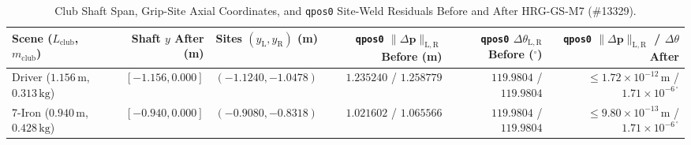 \documentclass[11pt,a4paper]{article}
\begin{document}
\begin{table}[h!]
\centering
\caption{Club Shaft Span, Grip-Site Axial Coordinates, and \texttt{qpos0} Site-Weld Residuals Before and After HRG-GS-M7 (\#13329).}
\label{tab:hrg-gs-m7-shaft-fix}
\small
\begin{tabular}{lrrrrr}
\toprule
Scene ($L_{\mathrm{club}}$, $m_{\mathrm{club}}$) & Shaft $y$ After (m) & Sites $(y_{\mathrm{L}}, y_{\mathrm{R}})$ (m) & \texttt{qpos0} $\|\Delta \mathbf{p}\|_{\mathrm{L,R}}$ Before (m) & \texttt{qpos0} $\Delta \theta_{\mathrm{L,R}}$ Before ($^\circ$) & \texttt{qpos0} $\|\Delta \mathbf{p}\|_{\mathrm{L,R}}$ / $\Delta \theta$ After \\
\midrule
Driver ($1.156\,\mathrm{m}$, $0.313\,\mathrm{kg}$) & $[-1.156, 0.000]$ & $(-1.1240, -1.0478)$ & $1.235240$ / $1.258779$ & $119.9804$ / $119.9804$ & $\le 1.72 \times 10^{-12}\,\mathrm{m}$ / $1.71 \times 10^{-6\,^\circ}$ \\
7-Iron ($0.940\,\mathrm{m}$, $0.428\,\mathrm{kg}$) & $[-0.940, 0.000]$ & $(-0.9080, -0.8318)$ & $1.021602$ / $1.065566$ & $119.9804$ / $119.9804$ & $\le 9.80 \times 10^{-13}\,\mathrm{m}$ / $1.71 \times 10^{-6\,^\circ}$ \\
\bottomrule
\end{tabular}
\end{table}
\end{document}
